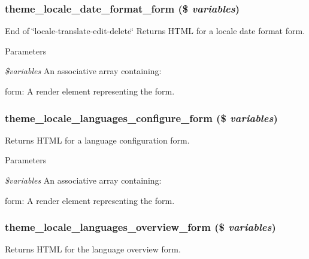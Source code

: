 \hypertarget{group__themeable_gafc8684caeae65fd531143223aeb5525b}{
\subsubsection[{theme\_\-locale\_\-date\_\-format\_\-form}]{\setlength{\rightskip}{0pt plus 5cm}theme\_\-locale\_\-date\_\-format\_\-form (\$ {\em variables})}}
\label{group__themeable_gafc8684caeae65fd531143223aeb5525b}
End of \char`\"{}locale-\/translate-\/edit-\/delete\char`\"{} Returns HTML for a locale date format form.


\begin{DoxyParams}{Parameters}
\item[{\em \$variables}]An associative array containing:
\begin{DoxyItemize}
\item form: A render element representing the form. 
\end{DoxyItemize}\end{DoxyParams}
\hypertarget{group__themeable_gad16df2552ed4113a2043e83502d4aeba}{
\subsubsection[{theme\_\-locale\_\-languages\_\-configure\_\-form}]{\setlength{\rightskip}{0pt plus 5cm}theme\_\-locale\_\-languages\_\-configure\_\-form (\$ {\em variables})}}
\label{group__themeable_gad16df2552ed4113a2043e83502d4aeba}
Returns HTML for a language configuration form.


\begin{DoxyParams}{Parameters}
\item[{\em \$variables}]An associative array containing:
\begin{DoxyItemize}
\item form: A render element representing the form. 
\end{DoxyItemize}\end{DoxyParams}
\hypertarget{group__themeable_ga3e850294586d271065fce8ed9bf7af90}{
\subsubsection[{theme\_\-locale\_\-languages\_\-overview\_\-form}]{\setlength{\rightskip}{0pt plus 5cm}theme\_\-locale\_\-languages\_\-overview\_\-form (\$ {\em variables})}}
\label{group__themeable_ga3e850294586d271065fce8ed9bf7af90}
Returns HTML for the language overview form.


